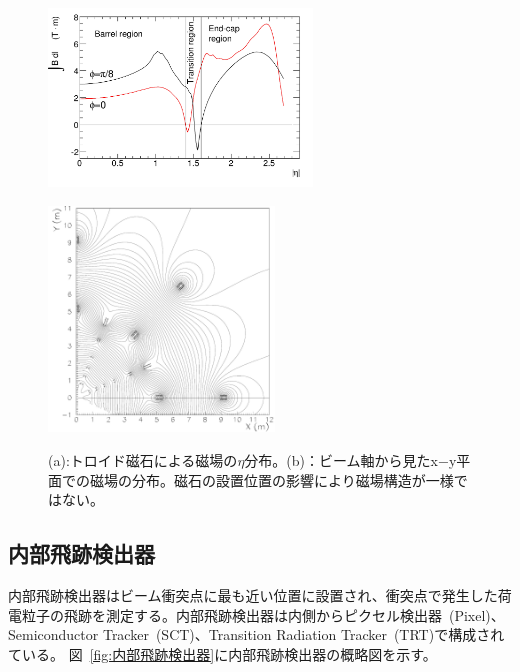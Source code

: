 \begin{figure}
    \centering
    \begin{minipage}[b]{0.4\linewidth}
        \centering
        \includegraphics[clip, width=7cm]{fig/2/IBdl.pdf}
        \vspace{10pt}
        \subcaption{}
        \label{fig:磁場eta}
    \end{minipage}
    \hfill
    \begin{minipage}[b]{0.5\linewidth}
        \centering
        \includegraphics[clip, width=6cm]{fig/2/FMBmap.pdf}
        \vspace{10pt}
        \subcaption{}
        \label{fig:磁場平面}
    \end{minipage}
    \caption{(a):トロイド磁石による磁場の$\eta$分布\cite{Aad:1129811}。(b)：ビーム軸から見たx−y平面での磁場の分布\cite{article:ATLASMagneticField}。磁石の設置位置の影響により磁場構造が一様ではない。}
    \label{fig:磁場}
\end{figure}




\subsection{内部飛跡検出器}
内部飛跡検出器はビーム衝突点に最も近い位置に設置され、衝突点で発生した荷電粒子の飛跡を測定する。内部飛跡検出器は内側からピクセル検出器~(Pixel)、Semiconductor Tracker~(SCT)、Transition Radiation Tracker~(TRT)で構成されている。
図~\ref{fig:内部飛跡検出器}に内部飛跡検出器の概略図を示す。

